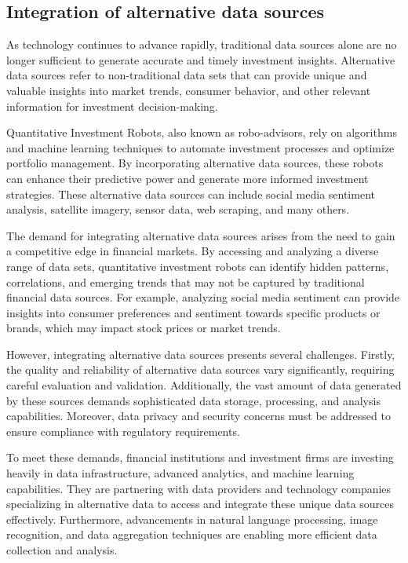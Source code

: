 \documentclass[UTF8]{ctexart}
\begin{document}
\subsection{Integration of alternative data sources}
As technology continues to advance rapidly, traditional data sources alone are no longer sufficient to generate accurate and timely investment insights. Alternative data sources refer to non-traditional data sets that can provide unique and valuable insights into market trends, consumer behavior, and other relevant information for investment decision-making.

Quantitative Investment Robots, also known as robo-advisors, rely on algorithms and machine learning techniques to automate investment processes and optimize portfolio management. By incorporating alternative data sources, these robots can enhance their predictive power and generate more informed investment strategies. These alternative data sources can include social media sentiment analysis, satellite imagery, sensor data, web scraping, and many others.

The demand for integrating alternative data sources arises from the need to gain a competitive edge in financial markets. By accessing and analyzing a diverse range of data sets, quantitative investment robots can identify hidden patterns, correlations, and emerging trends that may not be captured by traditional financial data sources. For example, analyzing social media sentiment can provide insights into consumer preferences and sentiment towards specific products or brands, which may impact stock prices or market trends.

However, integrating alternative data sources presents several challenges. Firstly, the quality and reliability of alternative data sources vary significantly, requiring careful evaluation and validation. Additionally, the vast amount of data generated by these sources demands sophisticated data storage, processing, and analysis capabilities. Moreover, data privacy and security concerns must be addressed to ensure compliance with regulatory requirements.

To meet these demands, financial institutions and investment firms are investing heavily in data infrastructure, advanced analytics, and machine learning capabilities. They are partnering with data providers and technology companies specializing in alternative data to access and integrate these unique data sources effectively. Furthermore, advancements in natural language processing, image recognition, and data aggregation techniques are enabling more efficient data collection and analysis.
\end{document}
